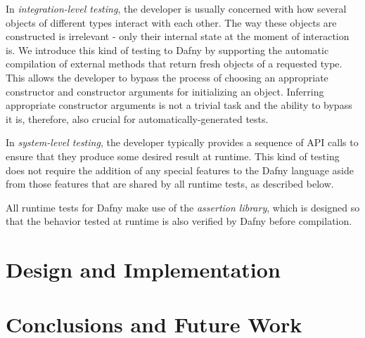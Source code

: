 \documentclass[runningheads]{llncs}
\begin{document}
In \textit{integration-level testing}, the developer is usually concerned with how several objects of different types interact with each other. 
The way these objects are constructed is irrelevant - only their internal state at the moment of interaction is. 
We introduce this kind of testing to Dafny by supporting the automatic compilation of external methods that return fresh objects of a requested type. 
This allows the developer to bypass the process of choosing an appropriate constructor and constructor arguments for initializing an object. 
Inferring appropriate constructor arguments is not a trivial task and the ability to bypass it is, therefore, also crucial for automatically-generated tests.

In \textit{system-level testing}, the developer typically provides a sequence of API calls to ensure that they produce some desired result at runtime. 
This kind of testing does not require the addition of any special features to the Dafny language aside from those features that are shared by all runtime tests, as described below. 

All runtime tests for Dafny make use of the \textit{assertion library}, which is designed so that the behavior tested at runtime is also verified by Dafny before compilation. 

\section{Design and Implementation}
\label{design}



\section{Conclusions and Future Work}
\label{future}

\newpage


\end{document}
